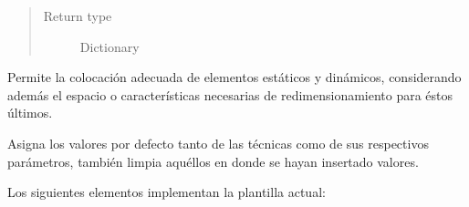 \documentclass[class=report, crop=false]{standalone}
\begin{document}
\begin{fulllineitems}
\begin{fulllineitems}
\begin{quote}
\begin{description}
\item[{Return type}] \leavevmode
Dictionary
\end{description}\end{quote}

\end{fulllineitems}

\begin{fulllineitems}

Permite la colocación adecuada de elementos estáticos y 
dinámicos, considerando además el espacio o características 
necesarias de redimensionamiento para éstos últimos.

\end{fulllineitems}

\begin{fulllineitems}

Asigna los valores por defecto tanto de las técnicas como 
de sus respectivos parámetros, también limpia aquéllos en 
donde se hayan insertado valores.

\end{fulllineitems}

\end{fulllineitems}

Los siguientes elementos implementan la plantilla actual:
\end{document}
